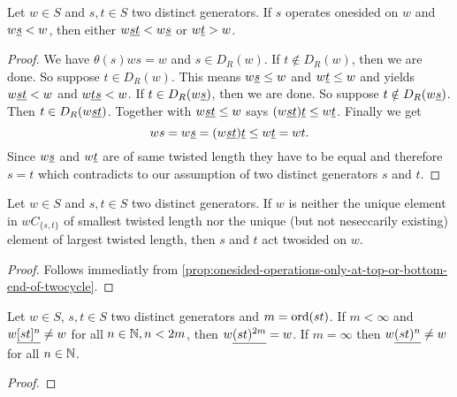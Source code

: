 \begin{prop}
	Let $w \in S$ and $s,t \in S$ two distinct generators. If $s$ operates onesided on $w$ and $w \underline{s} < w$, then either $w \underline{st} < w \underline{s}$ or $w \underline{t} > w$.

	\begin{proof}
		We have $\theta(s)ws = w$ and $s \in D_R(w)$. If $t \notin D_R(w)$, then we are done. So suppose $t \in D_R(w)$. This means $w \underline{s} \leq w$ and $w \underline{t} \leq w$ and \cite[Lemma 3.9]{hultman:comb-twisted-invo} yields $w \underline{st} < w$ and $w \underline{ts} < w$. If $t \in D_R(w \underline{s})$, then we are done. So suppose $t \notin D_R(w \underline{s})$. Then $t \in D_R(w \underline{st})$. Together with $w \underline{st} \leq w$ \cite[Lemma 3.9(2)]{hultman:comb-twisted-invo} says $(w \underline{st}) \underline{t} \leq w \underline{t}$. Finally we get
		$$ ws = w \underline{s} = (w \underline{st}) \underline{t} \leq w \underline{t} = wt.$$
		Since $w \underline{s}$ and $w \underline{t}$ are of same twisted length they have to be equal and therefore $s = t$ which contradicts to our assumption of two distinct generators $s$ and $t$.
	\end{proof}
\end{prop}

\begin{coro}
	Let $w \in S$ and $s,t \in S$ two distinct generators. If $w$ is neither the unique element in $wC_{\{s,t\}}$ of smallest twisted length nor the unique (but not neseccarily existing) element of largest twisted length, then $s$ and $t$ act twosided on $w$.

	\begin{proof}
		Follows immediatly from \ref{prop:onesided-operations-only-at-top-or-bottom-end-of-twocycle}.
	\end{proof}
\end{coro}

\begin{lemm}
	Let $w \in S$, $s,t \in S$ two distinct generators and $m = \operatorname{ord}(st)$. If $m < \infty$ and $w \underline{[st]^n} \neq w$ for all $n \in \mathbb{N}, n < 2m$, then $w \underline{(st)^{2m}} = w$. If $m = \infty$ then $w \underline{(st)^n} \neq w$ for all $n \in \mathbb{N}$.

	\begin{proof}
		\todo
	\end{proof}
\end{lemm}